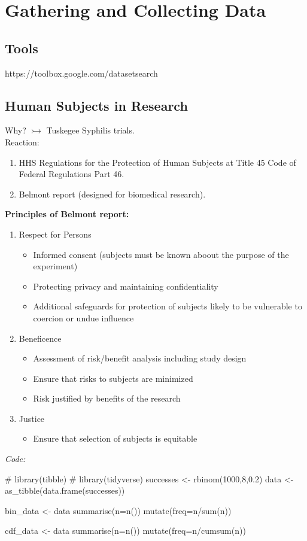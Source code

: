 \section{Gathering and Collecting Data}
\subsection*{Tools}
https://toolbox.google.com/datasetsearch
\subsection*{Human Subjects in Research}
Why? $\rightarrowtail$ Tuskegee Syphilis trials. \\
Reaction: 
\begin{enumerate}
    \item HHS Regulations for the Protection of Human Subjects at Title 45 Code of Federal Regulations Part 46. 
    \item Belmont report (designed for biomedical research). 
\end{enumerate}
\textbf{Principles of Belmont report: }
\begin{enumerate}
   \item Respect for Persons
   \begin{itemize}
     \item Informed consent (subjects must be known aboout the purpose of the experiment)
     \item Protecting privacy and maintaining confidentiality
     \item Additional safeguards for protection of subjects likely to be vulnerable to coercion or undue influence
   \end{itemize}
   \item Beneficence
   \begin{itemize}
     \item Assessment of risk/benefit analysis including study design
     \item Ensure that risks to subjects are minimized
     \item Risk justified by benefits of the research
   \end{itemize}
   \item Justice
   \begin{itemize}
     \item Ensure that selection of subjects is equitable
   \end{itemize}
\end{enumerate}
\textit{Code: }
\begin{spverbatim}
# library(tibble)
# library(tidyverse)
successes <- rbinom(1000,8,0.2)
data <- as_tibble(data.frame(successes))

bin_data <- data %
  summarise(n=n()) %
  mutate(freq=n/sum(n))
  
cdf_data <- data %
  summarise(n=n()) %
  mutate(freq=n/cumsum(n))
\end{spverbatim}